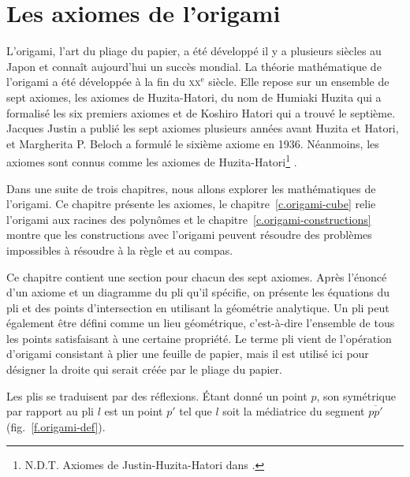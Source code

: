 \chapter{Les axiomes de l'origami}\label{c.origami-axioms}





L'origami, l'art du pliage du papier, a été développé il y a plusieurs siècles au Japon et connaît aujourd'hui un succès mondial. La théorie mathématique de l'origami a été développée à la fin du \textsc{xx}$^\text{e}$ siècle. Elle repose sur un ensemble de sept axiomes, les \og axiomes de  Huzita-Hatori\fg{}, du nom de Humiaki Huzita qui a formalisé les six premiers axiomes et de Koshiro Hatori qui a trouvé le septième. Jacques Justin a publié les sept axiomes plusieurs années avant Huzita et Hatori, et Margherita P. Beloch a formulé le sixième axiome en 1936. Néanmoins, les axiomes sont connus comme les axiomes de Huzita-Hatori\footnote{N.D.T. \og Axiomes de Justin-Huzita-Hatori\fg{} dans \cite{Delahaye}.} .

Dans une suite de trois chapitres, nous allons explorer les mathématiques de l'origami. Ce chapitre présente les axiomes, le chapitre~\ref{c.origami-cube} relie l'origami aux racines des polynômes et le chapitre~\ref{c.origami-constructions} montre que les constructions avec l'origami peuvent résoudre des problèmes impossibles à résoudre à la règle et au compas.
 
Ce chapitre contient une section pour chacun des sept axiomes. Après l'énoncé d'un axiome et un diagramme du pli qu'il spécifie, on présente les équations du pli et des points d'intersection en utilisant la géométrie analytique. Un pli peut également être défini comme un lieu géométrique, c'est-à-dire l'ensemble de tous les points satisfaisant à une certaine propriété. Le terme \og pli\fg{} vient de l'opération d'origami consistant à plier une feuille de papier, mais il est utilisé ici pour désigner la droite qui serait créée par le pliage du papier.

Les plis se traduisent par des réflexions. Étant donné un point $p$, son symétrique par rapport au pli $l$ est un point $p'$ tel que $l$ soit la médiatrice du segment  $\overline{pp'}$  (fig.~\ref{f.origami-def}).


